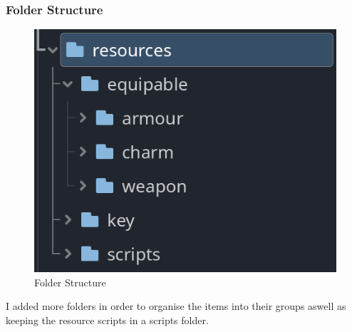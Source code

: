 \documentclass{article}
\begin{document}
        \subsubsection{Folder Structure}
        \begin{figure}[H]
                \centering
                \includegraphics{images/development/Item_folder.PNG}
                \caption{Folder Structure}
        \end{figure}
        \[\]
        I added more folders in order to organise the items into their groups aswell as keeping the resource scripts in a scripts folder.\\
\end{document}
